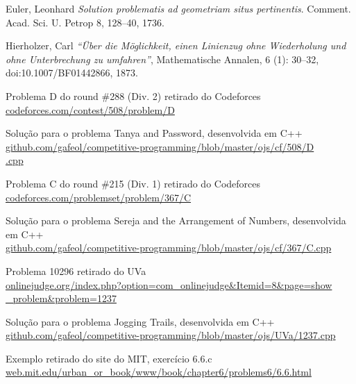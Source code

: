 \documentclass[12pt, a4paper]{article}
\begin{document}
	\begin{thebibliography}{9}
	Euler, Leonhard
	\textit{Solution problematis ad geometriam situs pertinentis}. 
	Comment. Acad. Sci. U. Petrop 8, 128–40, 1736.

	Hierholzer, Carl
	\textit{``Über die Möglichkeit, einen Linienzug ohne Wiederholung und ohne Unterbrechung zu umfahren''}, 
	Mathematische Annalen, 6 (1): 30–32, doi:10.1007/BF01442866, 1873.

    Problema D do round \#288 (Div. 2) retirado do Codeforces\\
    \href{https://codeforces.com/contest/508/problem/D}{codeforces.com/contest/508/problem/D}

    Solução para o problema Tanya and Password, desenvolvida em C++\\
    \href{https://github.com/gafeol/competitive-programming/blob/master/ojs/cf/508/D.cpp}{github.com/gafeol/competitive-programming/blob/master/ojs/cf/508/D\\.cpp}

    Problema C do round \#215 (Div. 1) retirado do Codeforces\\
    \href{https://codeforces.com/problemset/problem/367/C}{codeforces.com/problemset/problem/367/C}

    Solução para o problema Sereja and the Arrangement of Numbers, desenvolvida em C++\\
    \href{https://github.com/gafeol/competitive-programming/blob/master/ojs/cf/367/C.cpp}{github.com/gafeol/competitive-programming/blob/master/ojs/cf/367/C.cpp}

    Problema 10296 retirado do UVa\\
    \href{https://onlinejudge.org/index.php?option=com_onlinejudge&Itemid=8&page=show_problem&problem=1237}{onlinejudge.org/index.php?option=com\_onlinejudge\&Itemid=8\&page=show\\\_problem\&problem=1237}

    Solução para o problema Jogging Trails, desenvolvida em C++\\
    \href{https://github.com/gafeol/competitive-programming/blob/master/ojs/UVa/1237.cpp}{github.com/gafeol/competitive-programming/blob/master/ojs/UVa/1237.cpp} 

    Exemplo retirado do site do MIT, exercício 6.6.c\\
    \href{http://web.mit.edu/urban_or_book/www/book/chapter6/problems6/6.6.html}{web.mit.edu/urban\_or\_book/www/book/chapter6/problems6/6.6.html} 


\end{thebibliography}
\end{document}
